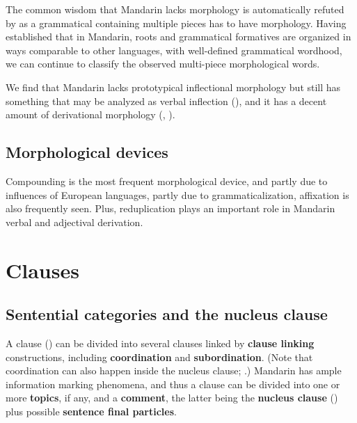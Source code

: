 \documentclass[UTF8, a4paper, oneside, scheme=plain, 12pt]{ctexrep}
\newcommand*{\concept}[1]{\textbf{#1}}
\begin{document}
The common wisdom that Mandarin lacks morphology is automatically refuted
by 
as a grammatical containing multiple pieces has to have morphology.
Having established that in Mandarin, roots and grammatical formatives are organized 
in ways comparable to other languages,
with well-defined grammatical wordhood,
we can continue to classify the observed multi-piece morphological words.

We find that Mandarin lacks prototypical inflectional morphology 
but still has something that may be analyzed as verbal inflection (),
and it has a decent amount of derivational morphology
(,
).

\subsection{Morphological devices}

Compounding is the most frequent morphological device,
and partly due to influences of European languages, partly due to grammaticalization,
affixation is also frequently seen.
Plus, reduplication plays an important role in Mandarin verbal and adjectival derivation.



\section{Clauses}\label{sec:grammatical.clause}

\subsection{Sentential categories and the nucleus clause}\label{sec:grammatical.clause.high-level}

A clause () can be divided into several clauses 
linked by \concept{clause linking} constructions,
including \concept{coordination} and \concept{subordination}.
(Note that coordination can also happen inside the nucleus clause;
.)
Mandarin has ample information marking phenomena,
and thus a clause can be divided into
one or more \concept{topics}, if any, and a \concept{comment},
the latter being the \concept{nucleus clause} ()
plus possible \concept{sentence final particles}.
\end{document}
